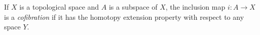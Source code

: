 \documentclass[12pt]{article}
\begin{document}
If $X$ is a topological space and $A$ is a subspace of $X$, the inclusion map $i:A \to X$ is a \emph{cofibration} if it has the homotopy extension property with respect to any space $Y$.
\end{document}

